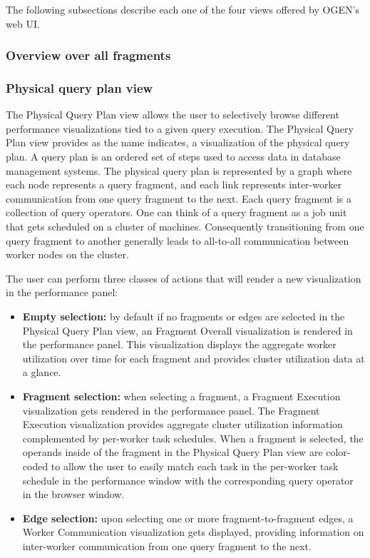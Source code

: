 \documentclass{chi2009}
\newcommand*{\system}{OGEN\xspace}
\newcommand*{\graph}{Physical Query Plan\xspace}
\newcommand*{\fragment}{Fragment Execution\xspace}
\newcommand*{\network}{Worker Communication\xspace}
\newcommand*{\overall}{Fragment Overall\xspace}
\begin{document}
The following subsections describe each one of the four views offered by \system's web UI.



\subsubsection{Overview over all fragments}
\label{sec:fragments}



\subsubsection{Physical query plan view}


The \graph view allows the user to selectively browse different performance visualizations tied to a given query execution. The \graph view provides as the name indicates, a visualization of the physical query plan. A query plan is an ordered set of steps used to access data in database management systems. The physical query plan is represented by a graph where each node represents a query fragment, and each link represents inter-worker communication from one query fragment to the next. Each query fragment is a collection of query operators. One can think of a query fragment as a job unit that gets scheduled on a cluster of machines. Consequently transitioning from one query fragment to another generally leads to all-to-all communication between worker nodes on the cluster. 

The user can perform three classes of actions that will render a new visualization in the performance panel:
\begin{itemize}

    \item \textbf{Empty selection:} by default if no fragments or edges are selected in the \graph view, an \overall visualization is rendered in the performance panel. This visualization displays the aggregate worker utilization over time for each fragment and provides cluster utilization data at a glance.
    \item \textbf{Fragment selection:} when selecting a fragment, a \fragment visualization gets rendered in the performance panel. The \fragment visualization provides aggregate cluster utilization information complemented by per-worker task schedules. When a fragment is selected, the operands inside of the fragment in the \graph view are color-coded to allow the user to easily match each task in the per-worker task schedule in the performance window with the corresponding query operator in the browser window.
    \item \textbf{Edge selection:} upon selecting one or more fragment-to-fragment edges, a \network visualization gets displayed, providing information on inter-worker communication from one query fragment to the next.
    
\end{itemize}
\end{document}
